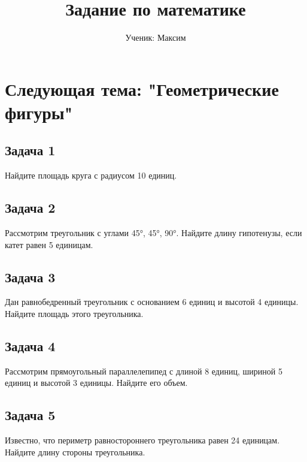 \documentclass{article}
\begin{document}
\title{Задание по математике}
\author{Ученик: Максим}
\date{}
\maketitle

\section*{Следующая тема: "Геометрические фигуры"}

\subsection*{Задача 1}
Найдите площадь круга с радиусом 10 единиц.

\subsection*{Задача 2}
Рассмотрим треугольник с углами 45°, 45°, 90°. Найдите длину гипотенузы, если катет равен 5 единицам.

\subsection*{Задача 3}
Дан равнобедренный треугольник с основанием 6 единиц и высотой 4 единицы. Найдите площадь этого треугольника.

\subsection*{Задача 4}
Рассмотрим прямоугольный параллелепипед с длиной 8 единиц, шириной 5 единиц и высотой 3 единицы. Найдите его объем.

\subsection*{Задача 5}
Известно, что периметр равностороннего треугольника равен 24 единицам. Найдите длину стороны треугольника.
\end{document}
